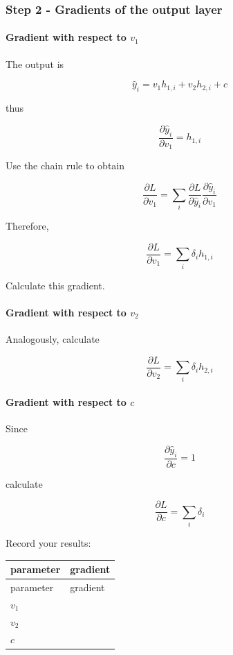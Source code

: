 \documentclass{course_sheet}
\begin{document}
\subsubsection*{Step 2 - Gradients of the output layer}
\paragraph*{Gradient with respect to $v_1$}
The output is

\[
\hat y_i=v_1h_{1,i}+v_2h_{2,i}+c
\]

thus

\[
\frac{\partial \hat y_i}{\partial v_1}=h_{1,i}
\]

Use the chain rule to obtain

\[
\frac{\partial L}{\partial v_1}=\sum_i\frac{\partial L}{\partial\hat y_i}\frac{\partial\hat y_i}{\partial v_1}
\]

Therefore,

\[
\frac{\partial L}{\partial v_1}=\sum_i \delta_i h_{1,i}
\]

Calculate this gradient.

\paragraph*{Gradient with respect to $v_2$}
Analogously, calculate

\[
\frac{\partial L}{\partial v_2}=\sum_i \delta_i h_{2,i}
\]

\paragraph*{Gradient with respect to $c$}
Since

\[
\frac{\partial\hat y_i}{\partial c}=1
\]

calculate

\[
\frac{\partial L}{\partial c}=\sum_i\delta_i
\]

Record your results:

\begingroup
\small
\setlength{\tabcolsep}{4pt}
\begin{longtable}{l|l}
parameter & gradient \\[1.5pt]
\hline
\endfirsthead
parameter & gradient \\[1.5pt]
\hline
\endhead
\rule{0pt}{2.4ex}$v_1$ &  $\phantom{-0.00}$ \\[3pt]
\rule{0pt}{2.4ex}$v_2$ &  $\phantom{-0.00}$ \\[3pt]
\rule{0pt}{2.4ex}$c$ &  $\phantom{-0.00}$ \\[3pt]
\end{longtable}
\endgroup
\end{document}
